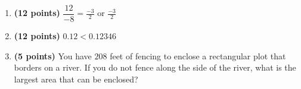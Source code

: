 \documentclass[12pt]{amsart}
\begin{document}
\begin{enumerate}
\vfill 
\def \a{7}\def \atwoone{2}\def \atwotwo{5}\def \atwothree{4}\def \btwothree{8}\def \sumtwothree{12}\def \diftwothree{-4}\def \bigtwothree{400}\def \powtwothree{4096}\def \logtwothree{0.6666666666666667}\def \factortwothree{57}\def \atwofour{1.57}\def \btwofour{1.585}\def \tooshorttwofour{10.1}\def \moneytwofour{10.10}\def \longertwofour{10.10000}\def \atwofive{0.12}\def \btwofive{0.12346}\def \athreeone{5}\def \bthreeone{6}\def \setthreetwo{[12, 6, 9]}\def \athreetwo{12}\def \bthreetwo{6}\def \cthreetwo{9}\def \controlthreethree{4}\def \athreethree{1}\def \topthreethree{0}\def \athreefour{4}\def \bthreefour{2}\def \listthreefour{[1, 2, 3, 5]}\def \afourone{12}\def \bfourone{-8}\def \fracfourone{\frac{-3}{2}}\def \rootfourtwo{20}\def \simplifiedfourtwo{2 \sqrt{5}}\def \sqrtlistfourtwo{[2, 5]}\def \outfourtwo{2}\def \infourtwo{5}\def \wowfourtwo{1}\def \afourthree{5}\def \nicethreefour{3x^{2}-x^{}+5}\def \nastythreefour{xyz^{3}+5}\def \cfourthree{-4}\def \dfourthree{10}\def \infourthree{-4x^{}}\def \outfourthree{+10y^{}}\def \afourfour{1683506}\def \nicefourfour{1,683,506}\def \goodfourfour{1,000,000.12345}\def \badfourfour{1,000,000.1}
\item {\bf (12 points)} 
 $\dfrac{\afourone}{\bfourone} = \fracfourone$ or $\displaystyle \fracfourone$ 

\vfill 
\def \a{7}\def \atwoone{1}\def \atwotwo{3}\def \atwothree{5}\def \btwothree{8}\def \sumtwothree{13}\def \diftwothree{-3}\def \bigtwothree{500}\def \powtwothree{32768}\def \logtwothree{0.7739760316291208}\def \factortwothree{91}\def \atwofour{1.79}\def \btwofour{1.037}\def \tooshorttwofour{10.1}\def \moneytwofour{10.10}\def \longertwofour{10.10000}\def \atwofive{0.12}\def \btwofive{0.12346}\def \athreeone{6}\def \bthreeone{7}\def \setthreetwo{[2, 5, 6]}\def \athreetwo{2}\def \bthreetwo{5}\def \cthreetwo{6}\def \controlthreethree{-4}\def \athreethree{1}\def \topthreethree{1}\def \athreefour{4}\def \bthreefour{2}\def \listthreefour{[1, 2, 3, 5]}\def \afourone{12}\def \bfourone{-6}\def \fracfourone{-2}\def \rootfourtwo{8}\def \simplifiedfourtwo{2 \sqrt{2}}\def \sqrtlistfourtwo{[2, 2]}\def \outfourtwo{2}\def \infourtwo{2}\def \wowfourtwo{1}\def \afourthree{-5}\def \nicethreefour{3x^{2}-x^{}-5}\def \nastythreefour{xyz^{3}-5}\def \cfourthree{-4}\def \dfourthree{10}\def \infourthree{-4x^{}}\def \outfourthree{+10y^{}}\def \afourfour{1563158}\def \nicefourfour{1,563,158}\def \goodfourfour{1,000,000.12345}\def \badfourfour{1,000,000.1}
\item {\bf (12 points)} 
 $\atwofive < \btwofive$ 
\vfill 
\newpage\def \x{52}\def \y{104}\def \L{208}\def \area{5408}
\item {\bf (5 points)} 
 You have $\L$ feet of fencing to enclose a rectangular plot that borders on a river. If you do not fence along the side of the river, what is the largest area that can be enclosed? \\


\end{enumerate}
\end{document}
